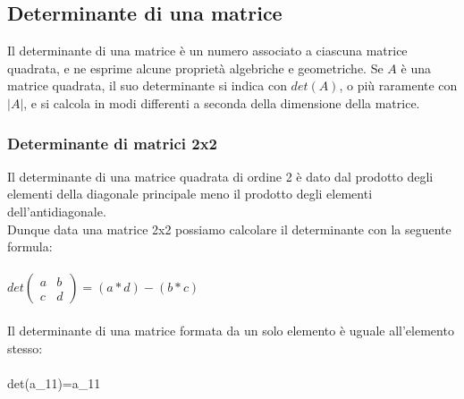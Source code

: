 \documentclass{report}
\begin{document}
\subsection{Determinante di una matrice}
Il determinante di una matrice è un numero associato a ciascuna matrice quadrata, e ne esprime alcune proprietà algebriche e geometriche. Se $A$ è una matrice quadrata, il suo determinante si indica con $det(A)$, o più raramente con $|A|$, e si calcola in modi differenti a seconda della dimensione della matrice.


\subsubsection{Determinante di matrici 2x2}
Il determinante di una matrice quadrata di ordine 2 è dato dal prodotto degli elementi della diagonale principale meno il prodotto degli elementi dell'antidiagonale.
\\
Dunque data una matrice 2x2 possiamo calcolare il determinante con la seguente formula:
\\
\\ 
$det\begin{pmatrix}
  a & b \\
  c & d
\end{pmatrix} = (a * d) - (b * c)$
\\
\\
Il determinante di una matrice formata da un solo elemento è uguale all'elemento stesso:
\\
\\
det(a_{11})=a_{11}
\end{document}
